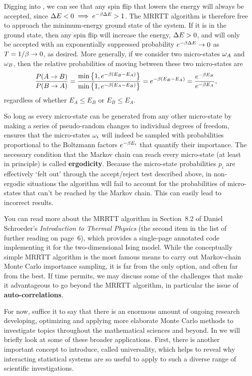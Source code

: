 Digging into , we can see that any spin flip that lowers the energy will always be accepted, since $\Delta E < 0 \implies e^{-\beta \Delta E} > 1$.
The MRRTT algorithm is therefore free to approach the minimum-energy ground state of the system.
If it is in the ground state, then any spin flip will increase the energy, $\Delta E > 0$, and will only be accepted with an exponentially suppressed probability $e^{-\beta \Delta E} \to 0$ as $T = 1 / \beta \to 0$, as desired.
More generally, if we consider two micro-states $\omega_A$ and $\omega_B$, then the relative probabilities of moving between these two micro-states are
\begin{equation}
  \label{eq:MRRTTdistribution}
  \frac{P(A \to B)}{P(B \to A)} = \frac{\mbox{min}\left\{1, e^{-\beta(E_B - E_A)}\right\}}{\mbox{min}\left\{1, e^{-\beta(E_A - E_B)}\right\}} = e^{-\beta(E_B - E_A)} = \frac{e^{-\beta E_B}}{e^{-\beta E_A}},
\end{equation}
regardless of whether $E_A \leq E_B$ or $E_B \leq E_A$.

So long as every micro-state can be generated from any other micro-state by making a series of pseudo-random changes to individual degrees of freedom,  ensures that the micro-states $\omega_i$ will indeed be sampled with probabilities proportional to the Boltzmann factors $e^{-\beta E_i}$ that quantify their importance.
The necessary condition that the Markov chain can reach every micro-state (at least in principle) is called \textbf{ergodicity}.
Because the micro-state probabilities $p_i$ are effectively `felt out' through the accept/reject test described above, in non-ergodic situations the algorithm will fail to account for the probabilities of micro-states that can't be reached by the Markov chain.
This can easily lead to incorrect results.

You can read more about the MRRTT algorithm in Section~8.2 of Daniel Schroeder's \textit{Introduction to Thermal Physics} (the second item in the list of further reading on page~6), which provides a single-page annotated code implementing it for the two-dimensional Ising model. %
While the conceptually simple MRRTT algorithm is the most famous means to carry out Markov-chain Monte Carlo importance sampling, it is far from the only option, and often far from the best.
If time permits, we may discuss some of the challenges that make it advantageous to go beyond the MRRTT algorithm, in particular the issue of \textbf{auto-correlations}.

For now, suffice it to say that there is an enormous amount of ongoing research developing, optimizing and applying more elaborate Monte Carlo methods to investigate topics throughout the mathematical sciences and beyond.
In  we will briefly look at some of these broader applications.
First, there is another important concept to introduce, called universality, which helps to reveal why interacting statistical systems are so useful to apply to such a diverse range of scientific investigations.



